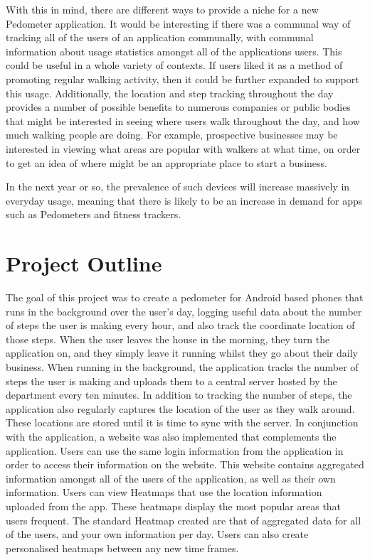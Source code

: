 \documentclass{l4proj}
\begin{document}
With this in mind, there are different ways to provide a niche for a new Pedometer application. It would be interesting if there was a communal way of tracking all of the users of an application communally, with communal information about usage statistics amongst all of the applications users. This could be useful in a whole variety of contexts. If users liked it as a method of promoting regular walking activity, then it could be further expanded to support this usage. Additionally, the location and step tracking throughout the day provides a number of possible benefits to numerous companies or public bodies that might be interested in seeing where users walk throughout the day, and how much walking people are doing. For example, prospective businesses may be interested in viewing what areas are popular with walkers at what time, on order to get an idea of where might be an appropriate place to start a business.

In the next year or so, the prevalence of such devices will increase massively in everyday usage, meaning that there is likely to be an increase in demand for apps such as Pedometers and fitness trackers. 

\section{Project Outline}

The goal of this project was to create a pedometer for Android based phones that runs in the background over the user's day, logging useful data about the number of steps the user is making every hour, and also track the coordinate location of those steps. When the user leaves the house in the morning, they turn the application on, and they simply leave it running whilst they go about their daily business. When running in the background, the application tracks the number of steps the user is making and uploads them to a central server hosted by the department every ten minutes. In addition to tracking the number of steps, the application also regularly captures the location of the user as they walk around. These locations are stored until it is time to sync with the server. In conjunction with the application, a website was also implemented that complements the application. Users can use the same login information from the application in order to access their information on the website. This website contains aggregated information amongst all of the users of the application, as well as their own information. Users can view Heatmaps that use the location information uploaded from the app. These heatmaps display the most popular areas that users frequent. The standard Heatmap created are that of aggregated data for all of the users, and your own information per day. Users can also create personalised heatmaps between any new time frames.
\end{document}
